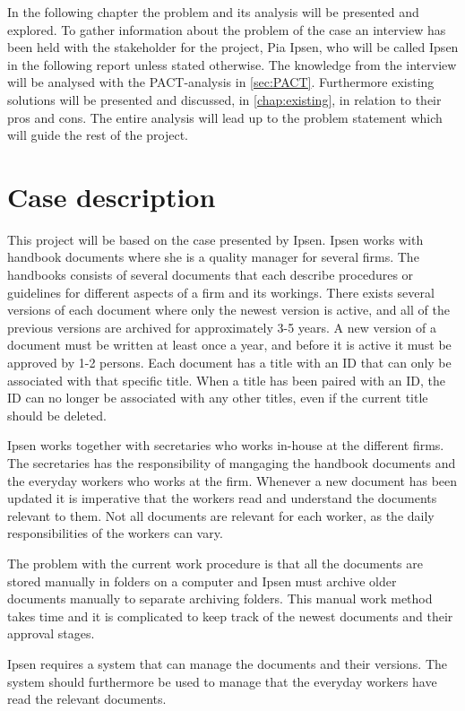 In the following chapter the problem and its analysis will be presented and explored. 
To gather information about the problem of the case an interview has been held with the stakeholder for the project, Pia Ipsen, who will be called Ipsen in the following report unless stated otherwise.
The knowledge from the interview will be analysed with the PACT-analysis in \cref{sec:PACT}.
Furthermore existing solutions will be presented and discussed, in \cref{chap:existing}, in relation to their pros and cons.
The entire analysis will lead up to the problem statement which will guide the rest of the project.

\section{Case description} \label{case}

This project will be based on the case presented by Ipsen.
Ipsen works with handbook documents where she is a quality manager for several firms.
The handbooks consists of several documents that each describe procedures or guidelines for different aspects of a firm and its workings.
There exists several versions of each document where only the newest version is active, and all of the previous versions are archived for approximately 3-5 years.
A new version of a document must be written at least once a year, and before it is active it must be approved by 1-2 persons.
Each document has a title with an ID that can only be associated with that specific title. 
When a title has been paired with an ID, the ID can no longer be associated with any other titles, even if the current title should be deleted.

Ipsen works together with secretaries who works in-house at the different firms.
The secretaries has the responsibility of mangaging the handbook documents and the everyday workers who works at the firm.
Whenever a new document has been updated it is imperative that the workers read and understand the documents relevant to them.
Not all documents are relevant for each worker, as the daily responsibilities of the workers can vary.

The problem with the current work procedure is that all the documents are stored manually in folders on a computer and Ipsen must archive older documents manually to separate archiving folders.
This manual work method takes time and it is complicated to keep track of the newest documents and their approval stages.

Ipsen requires a system that can manage the documents and their versions.
The system should furthermore be used to manage that the everyday workers have read the relevant documents.
